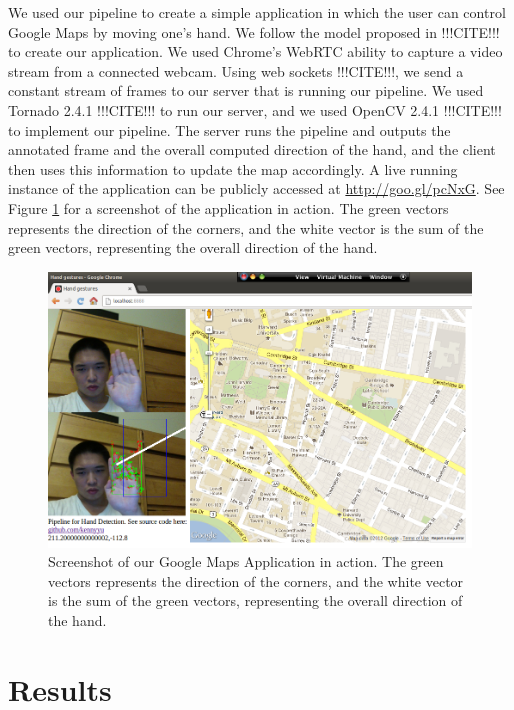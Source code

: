 \documentclass[12pt]{article}
\begin{document}
We used our pipeline to create a simple application in which the user can control Google Maps by moving one's hand. We follow the model proposed in !!!CITE!!! to create our application. We used Chrome's WebRTC ability to capture a video stream from a connected webcam. Using web sockets !!!CITE!!!, we send a constant stream of frames to our server that is running our pipeline. We used Tornado 2.4.1 !!!CITE!!! to run our server, and we used OpenCV 2.4.1 !!!CITE!!! to implement our pipeline. The server runs the pipeline and outputs the annotated frame and the overall computed direction of the hand, and the client then uses this information to update the map accordingly. A live running instance of the application can be publicly accessed at \url{http://goo.gl/pcNxG}. See Figure \ref{map} for a screenshot of the application in action. The green vectors represents the direction of the corners, and the white vector is the sum of the green vectors, representing the overall direction of the hand.

\noindent\begin{figure}[H]
\centering
\includegraphics[scale=0.45]{map.png}
\caption{Screenshot of our Google Maps Application in action. The green vectors represents the direction of the corners, and the white vector is the sum of the green vectors, representing the overall direction of the hand.}
\label{map}
\end{figure}

\section{Results}
\end{document}
